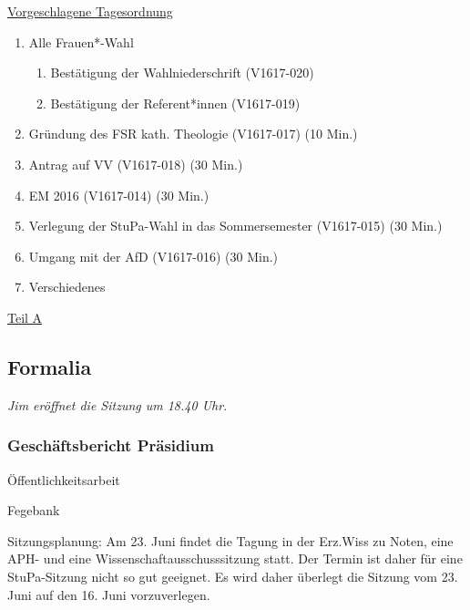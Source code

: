 \documentclass[ngerman,headheight=70pt]{scrartcl}
\begin{document}
    \newpage
    \underline{Vorgeschlagene Tagesordnung}
    \begin{enumerate}[label={\textbf{Top \theenumi}},leftmargin=*]
        \item Alle Frauen*-Wahl
            \begin{enumerate}
                \item Bestätigung der Wahlniederschrift (V1617-020)
                \item Bestätigung der Referent*innen (V1617-019)
            \end{enumerate}
        \item Gründung des FSR kath. Theologie (V1617-017) (10 Min.)
        \item Antrag auf VV (V1617-018) (30 Min.)
        \item EM 2016 (V1617-014) (30 Min.)
        \item Verlegung der StuPa-Wahl in das Sommersemester (V1617-015) (30 Min.)
        \item Umgang mit der AfD (V1617-016) (30 Min.)
        \item Verschiedenes
    \end{enumerate}

    \newpage


    {\Large \underline{Teil A}}

    \subsection{Formalia}

    \textit{Jim eröffnet die Sitzung um 18.40 Uhr.}

    \subsubsection{Geschäftsbericht Präsidium}

    Öffentlichkeitsarbeit

    Fegebank

    Sitzungsplanung:
    Am 23. Juni findet die Tagung in der Erz.Wiss zu Noten, eine APH- und eine
    Wissenschaftausschusssitzung statt. Der Termin ist daher für eine StuPa-Sitzung
    nicht so gut geeignet. Es wird daher überlegt die Sitzung vom 23. Juni auf den
    16. Juni vorzuverlegen.
\end{document}
